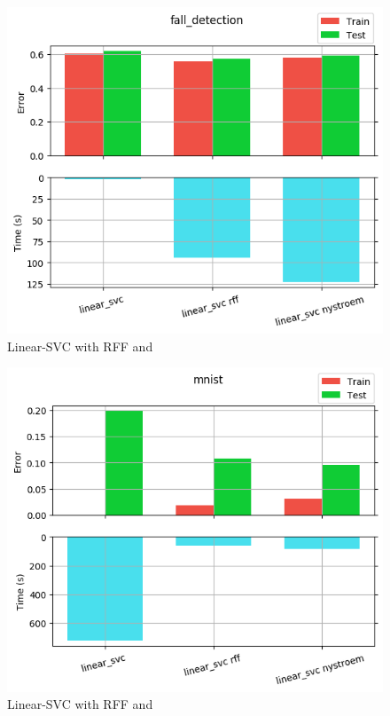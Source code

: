 \begin{figure}[th]
\centering
\includegraphics[scale=\imgscale]{Figures/2_5/fall_detection}
\decoRule
\caption[2.5 fall\tu detection]{Linear-SVC with RFF and \Nys}
\label{fig:2_5_fall_detection}
\end{figure}

\begin{figure}[th]
\centering
\includegraphics[scale=\imgscale]{Figures/2_5/mnist}
\decoRule
\caption[2.5 mnist]{Linear-SVC with RFF and \Nys}
\label{fig:2_5_mnist}
\end{figure}

